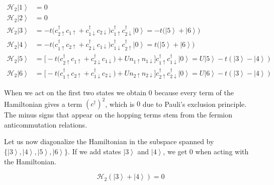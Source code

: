 \begin{equation}
\begin{split}
\mathcal{H}_{2}\left| 1 \right\rangle & = 0 \\
\mathcal{H}_{2}\left| 2 \right\rangle & = 0 \\
\mathcal{H}_{2}\left| 3 \right\rangle & =-t \big(c_{2\uparrow}^\dagger c_{1\uparrow} + c_{1\downarrow}^\dagger c_{2\downarrow} \big)c_{1\uparrow}^\dagger  c_{2\downarrow}^\dagger \left| 0 \right\rangle = -t \big( \left| 5 \right\rangle + \left| 6 \right\rangle \big)  \\
\mathcal{H}_{2}\left| 4 \right\rangle &=-t \big(c_{1\uparrow}^\dagger c_{2\uparrow} + c_{2\downarrow}^\dagger c_{1\downarrow} \big)c_{1\downarrow}^\dagger c_{2\uparrow}^\dagger \left| 0 \right\rangle = t \big( \left| 5 \right\rangle + \left| 6 \right\rangle \big) \\
\mathcal{H}_{2}\left| 5 \right\rangle & =\bigg[ -t \big(c_{2\uparrow}^\dagger c_{1\uparrow} + c_{2\downarrow}^\dagger c_{1\downarrow} \big) + U n_{1\uparrow}n_{1\downarrow}  \bigg]c_{1\uparrow}^\dagger c_{1\downarrow}^\dagger \left| 0 \right\rangle = U \left| 5 \right\rangle - t ( \left| 3 \right\rangle - \left| 4 \right\rangle )  \\
\mathcal{H}_{2}\left| 6 \right\rangle & = \bigg[ -t \big(c_{1\uparrow}^\dagger c_{2\uparrow} + c_{1\downarrow}^\dagger c_{2\downarrow} \big) + U n_{2\uparrow}n_{2\downarrow}  \bigg]c_{2\uparrow}^\dagger c_{2\downarrow}^\dagger \left| 0 \right\rangle = U \left| 6 \right\rangle - t ( \left| 3 \right\rangle - \left| 4 \right\rangle ) 
\end{split}
\end{equation}

When we act on the first two states we obtain $0$ because every term of the Hamiltonian gives a term $(c^\dagger)^2$, which is $0$ due to Pauli's exclusion principle.
The minus signs that appear on the hopping terms stem from the fermion anticommutation relations.

Let us now diagonalize the Hamiltonian in the subspace spanned by $\{\left| 3 \right\rangle, \left| 4 \right\rangle, \left| 5 \right\rangle, \left| 6 \right\rangle \}$.
If we add states $\left| 3 \right\rangle$ and $\left| 4 \right\rangle $, we get $0$ when acting with the Hamiltonian. 

\begin{equation}
\mathcal{H}_{2} ( \left| 3 \right\rangle + \left| 4 \right\rangle ) = 0
\end{equation}

